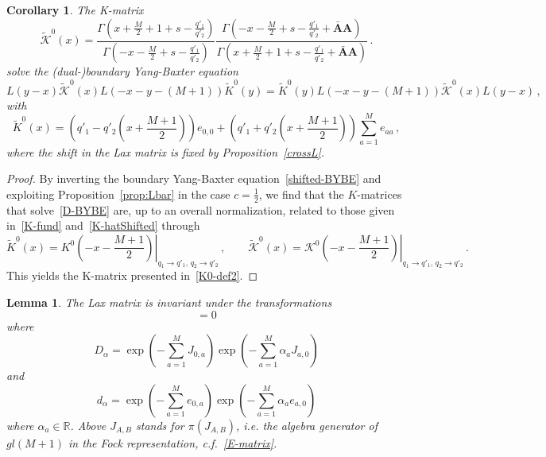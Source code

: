 \documentclass[11pt]{article}
\numberwithin{equation}{section}
\newtheorem{lemma}[theorem]{Lemma}
\newtheorem{corollary}[theorem]{Corollary}
\newcommand{\OA}{\mathbf{A}}
\newcommand{\OAD}{\mathbf{\bar{A}}}
\newcommand{\M}{M}
\newcommand{\Khat}{\mathcal{K}^{0}}
\newcommand{\K}{\widetilde{\mathcal{K}}^{0}}
\newcommand{\Khatfund}{K^{0}}
\newcommand{\Kfund}{\widetilde{K}^{0}}
\begin{document}
\begin{corollary}\label{Corollary-left-Kmatrix}
The K-matrix
 \begin{equation}\label{K0-def2}
\K(x)=\frac{\Gamma\left(x+\frac{\M}{2}+1
+s-\frac{q'_{1}}{q'_{2}}\right)}{\Gamma\left(-x-\frac{\M}{2}
+s-\frac{q'_{1}}{q'_{2}}\right)}\frac{\Gamma\left(-x-\frac{\M}{2}
+s-\frac{q'_{1}}{q'_{2}}+\OAD\OA\right)}{\Gamma\left(x+\frac{\M}{2}+1
+s-\frac{q'_{1}}{q'_{2}}+\OAD\OA\right)}\,.
 \end{equation}
 		solve the (dual-)boundary Yang-Baxter equation
\begin{equation}\label{D-BYBE}
       L(y-x)\K(x)L(-x-y-(\M+1))\Kfund(y)= \Kfund(y)L(-x-y-(\M+1))\K(x)L(y-x)\,,
    \end{equation}
    with
\begin{equation}\label{eq:Kfund2}
      \Kfund(x)=\left(q'_{1}-q'_{2}\left(x+\frac{\M+1}{2}\right)\right)e_{0,0}+\left(q'_{1}+q'_{2}\left(x+\frac{\M+1}{2}\right)\right)\sum_{a=1}^{\M} e_{aa}\,,
 \end{equation}
 where the shift in the Lax matrix is fixed by Proposition~\eqref{crossL}. 
  		\end{corollary}
\begin{proof} By inverting the boundary Yang-Baxter equation~\eqref{shifted-BYBE} and exploiting Proposition~\ref{prop:Lbar} in the case $c=\tfrac{1}{2}$, we find that the $K$-matrices that solve~\eqref{D-BYBE} are, up to an overall normalization, related to those given in~\eqref{K-fund} and~\eqref{K-hatShifted} through
     \begin{equation}
         \Kfund(x)=\left.\Khatfund\left(-x-\frac{\M+1}{2}\right)\right|_{q_{1}\to q'_{1},\,q_{2}\to q'_{2}}\,,\qquad    \K(x)=\left.\Khat\left(-x-\frac{\M+1}{2}\right)\right|_{q_{1}\to q'_{1},\,q_{2}\to q'_{2}}\,.
    \end{equation}
    This yields the K-matrix presented in~\eqref{K0-def2}.
\end{proof}



\begin{lemma}\label{lemmadd}
 The Lax matrix is invariant under the transformations
 \begin{equation}
 [L(x), d_\alpha\otimes D_\alpha]=0
 \end{equation}
 where
 \begin{equation}\label{dalpha}
  D_\alpha=\exp{\left(-\sum_{a=1}^{\M}J_{0,a}\right)}\exp{\left(-\sum_{a=1}^{\M}\alpha_{a}J_{a,0}\right)}
 \end{equation}
 and
 \begin{equation}\label{similarity-fundamental}
  d_\alpha=\exp{\left(-\sum_{ a=1}^{\M}e_{0,a}\right)}\exp{\left(-\sum_{a=1}^{\M}\alpha_{a}e_{a,0}\right)}
 \end{equation}
 where $\alpha_{a}\in\mathbb{R}$. Above $J_{A,B}$ stands for $\pi(J_{A,B})$, i.e. the algebra generator of $gl(\M+1)$ in the Fock representation, c.f.~\eqref{E-matrix}. 
\end{lemma}
\end{document}
